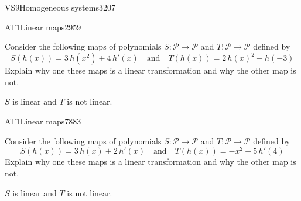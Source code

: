 \begin{exercise}{VS9}{Homogeneous systems}{3207}
\begin{exerciseAnswer}
     \end{exerciseAnswer}
 \end{exercise}


\begin{exercise}{AT1}{Linear maps}{2959} 
\begin{exerciseStatement} 

 Consider the following maps of polynomials \(S:\mathcal{P}\rightarrow\mathcal{P}\) and \(T:\mathcal{P}\rightarrow\mathcal{P}\) defined by \[
            S(h(x))=
                    3 \, h\left(x^{2}\right) + 4 \, h'\left(x\right)
                \hspace{1em} \text{and} \hspace{1em}
            T(h(x))=
                    2 \, h\left(x\right)^{2} - h\left(-3\right)
        \] Explain why one these maps is a linear transformation and why the other map is not. 

 \end{exerciseStatement}
 \begin{exerciseAnswer} 

\(S\) is linear and \(T\) is not linear.

 \end{exerciseAnswer}
 \end{exercise}


\begin{exercise}{AT1}{Linear maps}{7883} 
\begin{exerciseStatement} 

 Consider the following maps of polynomials \(S:\mathcal{P}\rightarrow\mathcal{P}\) and \(T:\mathcal{P}\rightarrow\mathcal{P}\) defined by \[
            S(h(x))=
                    3 \, h\left(x\right) + 2 \, h'\left(x\right)
                \hspace{1em} \text{and} \hspace{1em}
            T(h(x))=
                    -x^{2} - 5 \, h'\left(4\right)
        \] Explain why one these maps is a linear transformation and why the other map is not. 

 \end{exerciseStatement}
 \begin{exerciseAnswer} 

\(S\) is linear and \(T\) is not linear.

 \end{exerciseAnswer}
 \end{exercise}


